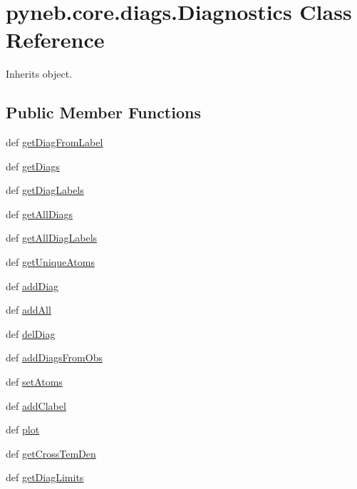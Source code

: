 \hypertarget{classpyneb_1_1core_1_1diags_1_1_diagnostics}{\section{pyneb.\-core.\-diags.\-Diagnostics Class Reference}
\label{classpyneb_1_1core_1_1diags_1_1_diagnostics}
}


Inherits object.

\subsection*{Public Member Functions}
\begin{DoxyCompactItemize}
\item 
def \hyperlink{classpyneb_1_1core_1_1diags_1_1_diagnostics_a34bf325468c95ac151665f2602db8212}{get\-Diag\-From\-Label}
\item 
def \hyperlink{classpyneb_1_1core_1_1diags_1_1_diagnostics_a18808ce820666aa8a7c2b8ad888b65c4}{get\-Diags}
\item 
def \hyperlink{classpyneb_1_1core_1_1diags_1_1_diagnostics_a5591d13f519b0176320ee605be97cb54}{get\-Diag\-Labels}
\item 
def \hyperlink{classpyneb_1_1core_1_1diags_1_1_diagnostics_ad55f9fd79ee4e6c1992b6e46ba3ffa9e}{get\-All\-Diags}
\item 
def \hyperlink{classpyneb_1_1core_1_1diags_1_1_diagnostics_a0777b326e22cca0e8b581b5ae6bb29f0}{get\-All\-Diag\-Labels}
\item 
def \hyperlink{classpyneb_1_1core_1_1diags_1_1_diagnostics_a44d4a10d700b48081fe18ef3a1a31832}{get\-Unique\-Atoms}
\item 
def \hyperlink{classpyneb_1_1core_1_1diags_1_1_diagnostics_a508fa9c5a2216f9eb4128338c33a6f75}{add\-Diag}
\item 
def \hyperlink{classpyneb_1_1core_1_1diags_1_1_diagnostics_a4061f4598d6e9e5a95a553a6bead8a4c}{add\-All}
\item 
def \hyperlink{classpyneb_1_1core_1_1diags_1_1_diagnostics_a64bbc36bfe0bb22570a1cb500cc395ef}{del\-Diag}
\item 
def \hyperlink{classpyneb_1_1core_1_1diags_1_1_diagnostics_ab6641fba2aa36c483b751dd1b9621734}{add\-Diags\-From\-Obs}
\item 
def \hyperlink{classpyneb_1_1core_1_1diags_1_1_diagnostics_a7eb28ac8852ba834dd3d23cd6113d27a}{set\-Atoms}
\item 
def \hyperlink{classpyneb_1_1core_1_1diags_1_1_diagnostics_a8b13216132933723bbf334abefbf8a88}{add\-Clabel}
\item 
def \hyperlink{classpyneb_1_1core_1_1diags_1_1_diagnostics_af8b435b5fd63db75d207a7d1327ce65a}{plot}
\item 
def \hyperlink{classpyneb_1_1core_1_1diags_1_1_diagnostics_a2b0ebbaab7ce09624c1bc930e62bc228}{get\-Cross\-Tem\-Den}
\item 
def \hyperlink{classpyneb_1_1core_1_1diags_1_1_diagnostics_a644625a4450d607244b53d76fb49a03b}{get\-Diag\-Limits}
\end{DoxyCompactItemize}
